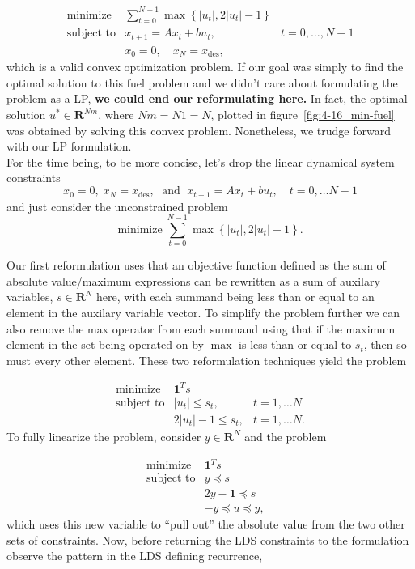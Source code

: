 \documentclass[12pt,reqno]{article}
\theoremstyle{definition}
\numberwithin{equation}{section}
\begin{document}
   \[\begin{array}{lll}
       \text{minimize} \; & \sum_{t=0}^{N-1} \max \left\{ \left| u_t \right|, 2 \left| u_t \right| - 1 \right\} & \\
       \text{subject to} & x_{t+1} = Ax_t + bu_t, \; & t=0, \ldots, N-1 \\
       & x_0 = 0, \quad x_{N} = x_{\text{des}},
       \end{array}\]
   which is a valid convex optimization problem. If our goal was
   simply to find the optimal solution to this fuel problem and we didn't care about 
   formulating the problem as a LP, \textbf{we could end our reformulating here.} In fact,
   the optimal solution $u^* \in \mathbf{R}^{Nm}$, where $Nm = N1 = N$, plotted in figure~\ref{fig:4-16_min-fuel}
   was obtained by solving this convex problem. 
   Nonetheless, we trudge forward with our LP formulation.\\
   For the time being, to be more concise, let's drop the linear dynamical system constraints
   \[x_0 = 0, \; x_N = x_{\text{des}}, \; \text{ and } \; x_{t+1} = Ax_t + bu_t, \quad t = 0, \ldots N-1\]
   and just consider the unconstrained problem
   \[\text{minimize} \; \sum_{t=0}^{N-1} \max \left\{ \left| u_t \right|, 2 \left| u_t \right| - 1 \right\}.\]

   Our first reformulation uses that an objective function defined as the sum of absolute value/maximum expressions can be rewritten
   as a sum of auxilary variables, $s \in \mathbf{R}^N$ here, with each summand being less than
   or equal to an element in the auxilary variable vector. To simplify the problem further we can also 
   remove the max operator from each summand using that if the maximum element in the set
   being operated on by $\max$ is less than or equal to $s_t$, then so must every other element.
   These two reformulation techniques yield the problem

   \[\begin{array}{lll}
   \text{minimize} \; & \bm{1}^T s & \\
   \text{subject to} & \left| u_t \right| \le s_t, & t = 1, \ldots N \\
   & 2 \left| u_t \right| - 1 \le s_t, & t = 1, \ldots N.
   \end{array}\]
   To fully linearize the problem, consider $y \in \mathbf{R}^N$ and the problem

   \[\begin{array}{lll}
   \text{minimize} \; & \bm{1}^T s & \\
   \text{subject to} & y \preceq s & \\
   & 2y - \bm{1} \preceq s \\
   & -y \preceq u \preceq y, & 
   \end{array}\]
   which uses this new variable to ``pull out'' the absolute value from the two other sets
   of constraints.
   Now, before returning the LDS constraints to the formulation observe the pattern in the LDS defining recurrence,
\end{document}
